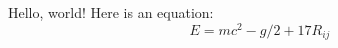 \documentclass{article}
\begin{document}
Hello, world! Here is an equation:
\[
E = mc^2 - g/2 + 17R_{ij}
\]
\end{document}

